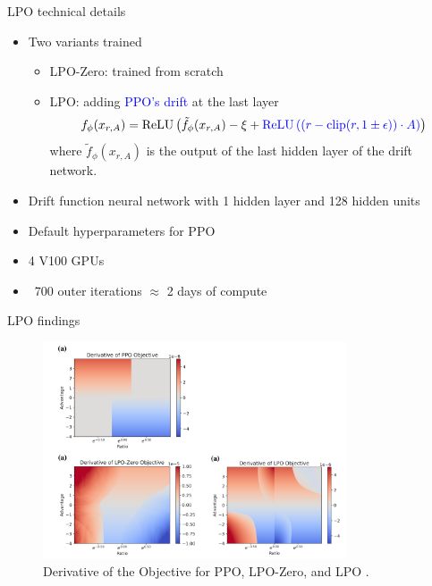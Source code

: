 \documentclass[9pt]{beamer}
\begin{document}
\begin{frame}{LPO technical details}

  \begin{itemize}
    \item Two variants trained
    \vspace{1em}  %
  \begin{itemize}
    \item LPO-Zero: trained from scratch
    \vspace{1em}  %
    \item LPO: adding \textcolor{blue}{PPO's drift} at the last layer 
    \[
   f_\phi(x_{r, A}) = \text{ReLU}\left( \tilde{f}_\phi(x_{r, A}) - \xi + \textcolor{blue}{\text{ReLU} \left( \left( r - \text{clip}(r, 1 \pm \epsilon) \right) \cdot A \right)} \right)
    \]
    where \( \tilde{f}_\phi(x_{r, A}) \) is the output of the last hidden layer of the drift network.
    \vspace{1em}  %
  \end{itemize}
    
    \item Drift function neural network with 1 hidden layer and 128 hidden units
    \vspace{1em}  %
    \item Default hyperparameters for PPO
    \vspace{1em}  %
    \item 4 V100 GPUs
    \vspace{1em}  %
    \item ~700 outer iterations \( \approx \) 2 days of compute
  \end{itemize}
  
\end{frame}


\begin{frame}{LPO findings}
  \begin{figure}
    \centering
    \includegraphics[width=0.8\textwidth]{figures/results1.png}
    \caption{Derivative of the Objective for PPO, LPO-Zero, and LPO \cite{dpo2022}.}
    \label{fig:trl5}
  \end{figure}
\end{frame}
\end{document}

